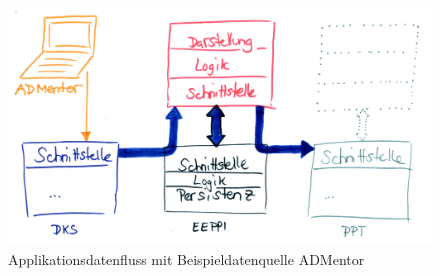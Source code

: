 	\begin{figure}[H]
		\includegraphics[width=\textwidth]{architecture/media/img/eeppiDataflow.jpg}
		\centering
		\caption{Applikationsdatenfluss mit Beispieldatenquelle ADMentor}
		\label{fig:applicationDataFlow}
	\end{figure}		